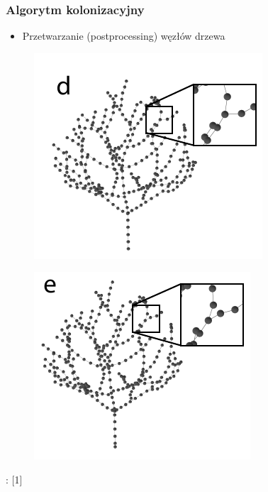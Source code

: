 \documentclass[blue,table]{beamer}
\begin{document}
\begin{frame}\frametitle{Algorytm kolonizacyjny}
\begin{itemize}
\item{Przetwarzanie (postprocessing) węzłów drzewa}
\end{itemize}\begin{multicols}{2}
\begin{figure}
\includegraphics[scale=0.5]{img/colonization_4.png} 
\end{figure}
\begin{figure}
\includegraphics[scale=0.5]{img/colonization_5.png} 
\end{figure}
\end{multicols}
\begin{footnotesize}
: [1]
\end{footnotesize}
\end{frame}
\end{document}
